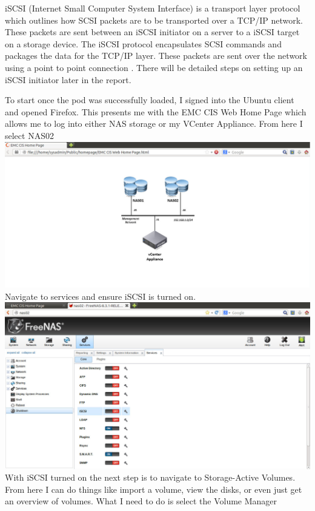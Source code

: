 iSCSI (Internet Small Computer System Interface) is a transport layer protocol which outlines how SCSI packets are to be transported over a TCP/IP network. These packets are sent between an iSCSI initiator on a server to a iSCSI target on a storage device. The iSCSI protocol encapsulates SCSI commands and packages the data for the TCP/IP layer. These packets are sent over the network using a point to point connection \cite{iscsi}. There will be detailed steps on setting up an iSCSI initiator later in the report. 

To start once the pod was successfully loaded, I signed into the Ubuntu client and opened Firefox. This presents me with the EMC CIS Web Home Page which allows me to log into either NAS storage or my VCenter Appliance. From here I select NAS02
\newline
\includegraphics[width=\textwidth]{1.png}
Navigate to services and ensure iSCSI is turned on.
\newline
\includegraphics[width=\textwidth]{2.png}
\newpage
With iSCSI turned on the next step is to navigate to Storage-Active Volumes. From here I can do things like import a volume, view the disks, or even just get an overview of volumes. What I need to do is select the Volume Manager 
\newline

